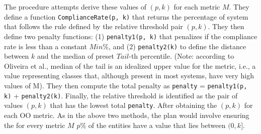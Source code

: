 The procedure attempts derive these values of $(p, k)$ for each metric $M$. They define a function \texttt{ComplianceRate(p, k)} that returns the percentage of system that follows the rule defined by the relative threshold pair $(p, k)$. They then define two penalty functions: (1) \texttt{penalty1(p, k)} that penalizes if the compliance rate is less than a constant $Min\%$, and (2) \texttt{penalty2(k)} to define the distance between $k$ and the median of preset $Tail$-th percentile. (Note: according to Oliveira et al., median of the tail is an idealized upper value for the metric, i.e., a value representing classes that, although present in most systems, have very high values of M). They then compute the total penalty as \texttt{penalty} = \texttt{penalty1(p, k)} + \texttt{penalty2(k)}. Finally, the relative threshold is identified as the pair of values $(p, k)$ that has the lowest total \texttt{penalty}. After obtaining the $(p, k)$ for each OO metric. As in the above two methods, the plan would involve ensuring the for every metric $M$ $p\%$ of the entities have a value that lies between $(0, k]$. 



